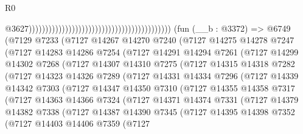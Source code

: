 \begin{lexlean}{R0}
\begin{coremodule}
                                                                                          @3627)))))))))))))))))))))))))))))))))))))))))))
    (fun (__b : @3372) =>
    @6749
      (@7129
        @7233
        (@7127
          @14267
          @14270
          @7240
          (@7127
            @14275
            @14278
            @7247
            (@7127
              @14283
              @14286
              @7254
              (@7127
                @14291
                @14294
                @7261
                (@7127
                  @14299
                  @14302
                  @7268
                  (@7127
                    @14307
                    @14310
                    @7275
                    (@7127
                      @14315
                      @14318
                      @7282
                      (@7127
                        @14323
                        @14326
                        @7289
                        (@7127
                          @14331
                          @14334
                          @7296
                          (@7127
                            @14339
                            @14342
                            @7303
                            (@7127
                              @14347
                              @14350
                              @7310
                              (@7127
                                @14355
                                @14358
                                @7317
                                (@7127
                                  @14363
                                  @14366
                                  @7324
                                  (@7127
                                    @14371
                                    @14374
                                    @7331
                                    (@7127
                                      @14379
                                      @14382
                                      @7338
                                      (@7127
                                        @14387
                                        @14390
                                        @7345
                                        (@7127
                                          @14395
                                          @14398
                                          @7352
                                          (@7127
                                            @14403
                                            @14406
                                            @7359
                                            (@7127

\end{coremodule}
\end{lexlean}
